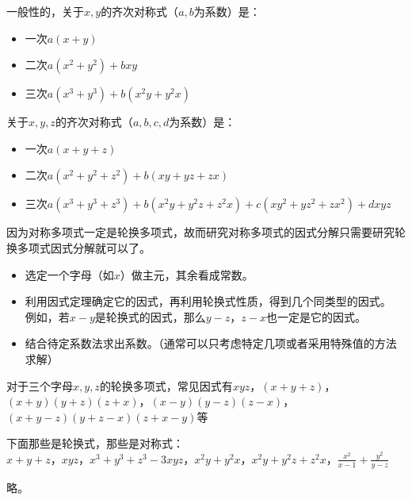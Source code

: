 \documentclass[windows,csize4,answers]{BHCexam}
\begin{document}
\begin{groups}
    一般性的，关于$x,y$的齐次对称式（$a,b$为系数）是：
    \begin{itemize}
        \item 一次$a(x+y)$
        \item 二次$a(x^2+y^2)+bxy$
        \item 三次$a(x^3+y^3)+b(x^2y+y^2x)$
    \end{itemize}
    关于$x,y,z$的齐次对称式（$a,b,c,d$为系数）是：
    \begin{itemize}
        \item 一次$a(x+y+z)$
        \item 二次$a(x^2+y^2+z^2)+b(xy+yz+zx)$
        \item 三次$a(x^3+y^3+z^3)+b(x^2y+y^2z+z^2x)+c(xy^2+yz^2+zx^2)+dxyz$
    \end{itemize}

    因为对称多项式一定是轮换多项式，故而研究对称多项式的因式分解只需要研究轮换多项式因式分解就可以了。
    \begin{itemize}
        \item 选定一个字母（如$x$）做主元，其余看成常数。
        \item 利用因式定理确定它的因式，再利用轮换式性质，得到几个同类型的因式。
              例如，若$x-y$是轮换式的因式，那么$y-z$，$z-x$也一定是它的因式。
        \item 结合待定系数法求出系数。（通常可以只考虑特定几项或者采用特殊值的方法求解）
    \end{itemize}
    对于三个字母$x,y,z$的轮换多项式，常见因式有$xyz$，$(x+y+z)$，$(x+y)(y+z)(z+x)$，$(x-y)(y-z)(z-x)$，
    $(x+y-z)(y+z-x)(z+x-y)$等


    \begin{questions}[]
        \question[5] 下面那些是轮换式，那些是对称式：\\
        $x+y+z$，$xyz$，$x^3+y^3+z^3-3xyz$，$x^2y+y^2x$，$x^2y+y^2z+z^2x$，$\frac{x^2}{x-1}+\frac{y^2}{y-z}$
        \begin{solution}{0.5cm}
            \methodonly 略。
        \end{solution}
        \vspace{3.5cm}


\end{questions}
\end{groups}
\end{document}
